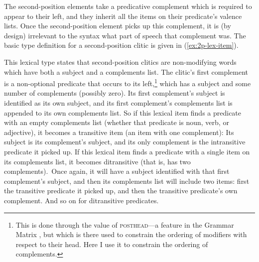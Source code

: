 The second-position elements take a predicative complement which is required to appear to their left, and they inherit all the items on their predicate's valence lists. Once the second-position element picks up this complement, it is (by design) irrelevant to the syntax what part of speech that complement was. The basic type definition for a second-position clitic is given in (\ref{ex:2p-lex-item}).

\begin{singlespacing}
\ex \label{ex:2p-lex-item}
\xe
\end{singlespacing}

This lexical type states that second-position clitics are non-modifying words which have both a subject and a complements list. The clitic's first complement is a non-optional predicate that occurs to its left,\footnote{This is done through the value of \textsc{posthead}---a feature in the Grammar Matrix \citep{bender2002}, but which is there used to constrain the ordering of modifiers with respect to their head. Here I use it to constrain the ordering of complements.} which has a subject and some number of complements (possibly zero). Its first complement's subject is identified as its own subject, and its first complement's complements list is appended to its own complements list. So if this lexical item finds a predicate with an empty complements list (whether that predicate is noun, verb, or adjective), it becomes a transitive item (an item with one complement): Its subject is its complement's subject, and its only complement is the intransitive predicate it picked up. If this lexical item finds a predicate with a single item on its complements list, it becomes ditransitive (that is, has two complements). Once again, it will have a subject identified with that first complement's subject, and then its complements list will include two items: first the transitive predicate it picked up, and then the transitive predicate's own complement. And so on for ditransitive predicates.

